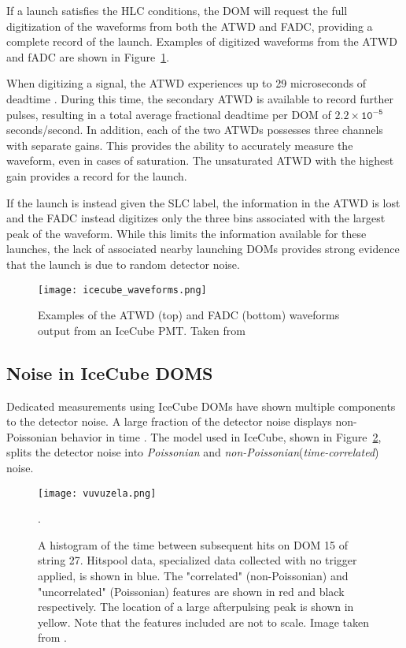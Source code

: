 If a launch satisfies the HLC conditions, the DOM will request the full digitization of the waveforms from both the ATWD and FADC, providing a complete record of the launch.
Examples of digitized waveforms from the ATWD and fADC are shown in Figure~\ref{fig:waveforms}.

When digitizing a signal, the ATWD experiences up to 29 microseconds of deadtime \cite{Description-IceCube}. 
During this time, the secondary ATWD is available to record further pulses, resulting in a total average fractional deadtime per DOM of $\mathtt{2.2 \times 10^{-5}}$ seconds/second.
In addition, each of the two ATWDs possesses three channels with separate gains.
This provides the ability to accurately measure the waveform, even in cases of saturation.
The unsaturated ATWD with the highest gain provides a record for the launch.

If the launch is instead given the SLC label, the information in the ATWD is lost and the FADC instead digitizes only the three bins associated with the largest peak of the waveform.
While this limits the information available for these launches, the lack of associated nearby launching DOMs provides strong evidence that the launch is due to random detector noise.

\begin{figure}
\centering
\texttt{[image: icecube\_waveforms.png]}
\caption{Examples of the ATWD (top) and FADC (bottom) waveforms output from an IceCube PMT. Taken from \cite{Description-IceCube}}
\label{fig:waveforms}
\end{figure}

\label{subsec:noise}
\subsection{Noise in IceCube DOMS}
Dedicated measurements using IceCube DOMs have shown multiple components to the detector noise\cite{Thesis-Vuvuzela}. 
A large fraction of the detector noise displays non-Poissonian behavior in time \cite{Description-IceCube}.
The model used in IceCube, shown in Figure~\ref{fig:noise_model}, splits the detector noise into \emph{Poissonian} and \emph{non-Poissonian}(\emph{time-correlated}) noise.

\begin{figure}
\centering
\texttt{[image: vuvuzela.png]} 
\caption{A histogram of the time between subsequent hits on DOM 15 of string 27. Hitspool data, specialized data collected with no trigger applied, is shown in blue. The "correlated" (non-Poissonian) and "uncorrelated" (Poissonian) features are shown in red and black respectively. The location of a large afterpulsing peak is shown in yellow. Note that the features included are not to scale. Image taken from \cite{Description-IceCube}.}
\label{fig:noise_model}.
\end{figure}

